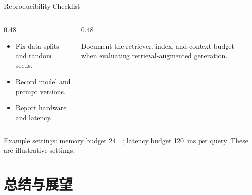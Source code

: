 \documentclass[aspectratio=169, UTF8]{ctexbeamer}
\begin{document}
\begin{frame}{Reproducibility Checklist}
  \begin{columns}[T,onlytextwidth]
    \begin{column}{0.48\textwidth}
      \begin{nkbox}[title={Experimental protocol}]
        \small
        \begin{itemize}
          \item Fix data splits and random seeds.
          \item Record model and prompt versions.
          \item Report hardware and latency.
        \end{itemize}
      \end{nkbox}
    \end{column}
    \begin{column}{0.48\textwidth}
      \begin{nkremark}[title={Retrieval baseline}]
        \small
        Document the retriever, index, and context budget when evaluating
        retrieval-augmented generation.
      \end{nkremark}
    \end{column}
  \end{columns}
  \vspace{0.5em}
  \small Example settings: memory budget \SI{24}{\giga\byte};
  latency budget \SI{120}{\milli\second} per query.
  These are illustrative settings.
\end{frame}

\section{总结与展望}
\end{document}
